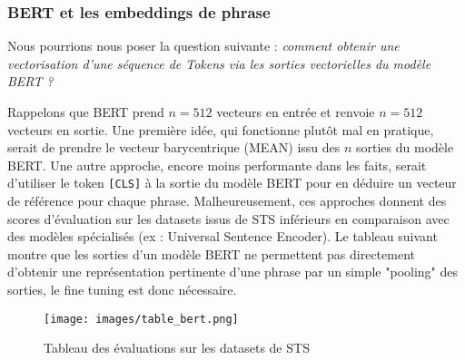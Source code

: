 \documentclass[12pt]{article}
\theoremstyle{definition}
\begin{document}
\subsubsection{BERT et les embeddings de phrase}
Nous pourrions nous poser la question suivante : \textit{comment obtenir une vectorisation d’une séquence de Tokens via les sorties vectorielles du modèle BERT ?}

Rappelons que BERT prend $n=512$ vecteurs en entrée et renvoie $n=512$ vecteurs en sortie. Une première idée, qui fonctionne plutôt mal en pratique, serait de prendre le vecteur barycentrique (MEAN) issu des $n$ sorties du modèle BERT. Une autre approche, encore moins performante dans les faits, serait d’utiliser le token \texttt{[CLS]} à la sortie du modèle BERT pour en déduire un vecteur de référence pour chaque phrase. Malheureusement, ces approches donnent des scores d’évaluation sur les datasets issus de STS \cite{sts} inférieurs en comparaison avec des modèles spécialisés (ex : Universal Sentence Encoder). Le tableau suivant montre que les sorties d’un modèle BERT ne permettent pas directement d’obtenir une représentation pertinente d’une phrase par un simple "pooling" des sorties, le fine tuning est donc nécessaire.
\newpage


\begin{figure*}[!h]
	\centering
	\texttt{[image: images/table\_bert.png]}
	\caption{Tableau des évaluations sur les datasets de STS \cite{sts}}
\end{figure*}
\end{document}
